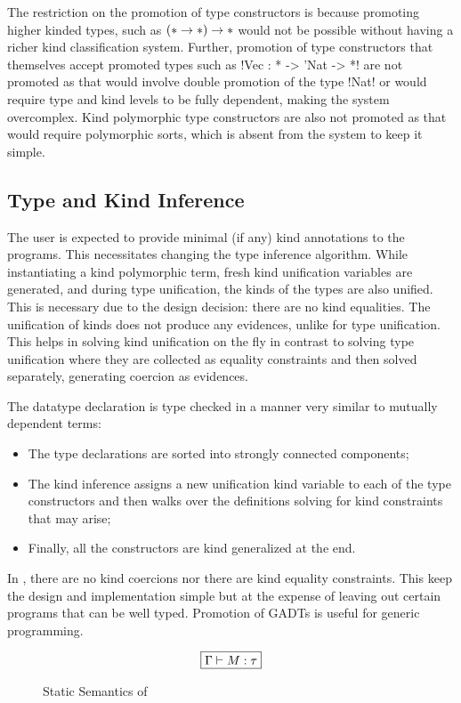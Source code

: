 \documentclass[manuscript,screen,nonacm]{acmart}
\begin{document}
The restriction on the promotion of type constructors is because promoting higher kinded types, such as $(\ast \to \ast) \to \ast$ would not be possible without having a richer kind classification system. Further, promotion of type constructors that themselves accept promoted types such as !Vec : * -> 'Nat -> *! are not promoted as that would involve double promotion of the type !Nat! or would require type and kind levels to be fully dependent, making the system overcomplex. Kind polymorphic type constructors are also not promoted as that would require polymorphic sorts, which is absent from the system to keep it simple.

\subsection{Type and Kind Inference}
The user is expected to provide minimal (if any) kind annotations to the programs. This necessitates changing the type inference algorithm. While instantiating a kind polymorphic term, fresh kind unification variables are generated, and during type unification, the kinds of the types are also unified. This is necessary due to the design decision: there are no kind equalities. The unification of kinds does not produce any evidences, unlike for type unification. This helps in solving kind unification on the fly in contrast to solving type unification where they are collected as equality constraints and then solved separately, generating coercion as evidences.

The datatype declaration is type checked in a manner very similar to mutually dependent terms:
\begin{itemize}
\item The type declarations are sorted into strongly connected components;
\item The kind inference assigns a new unification kind variable to each of the type constructors and then walks over the definitions solving for kind constraints that may arise;
\item Finally, all the constructors are kind generalized at the end.
\end{itemize}


In \SFP, there are no kind coercions nor there are kind equality constraints. This keep the design and implementation simple but at the expense of leaving out certain programs that can be well typed. Promotion of GADTs is useful for generic programming.


\begin{figure}[ht]
  \centering
  \begin{gather*}
    \fbox{$\Gamma \vdash M : \tau$}
  \end{gather*}
  \caption{Static Semantics of \SFP}
  \label{fig:sfp-typing}
\end{figure}
\end{document}
